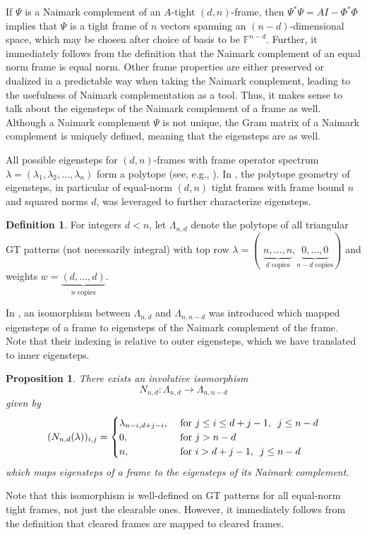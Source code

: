 \documentclass[10pt]{article}
\theoremstyle{plain}
\newtheorem{prop}[thm]{Proposition}
\theoremstyle{definition}
\newtheorem{definition}[thm]{Definition}
\newcommand{\bF}{\mathbb{F}}
\begin{document}
If $\Psi$ is a Naimark complement of an $A$-tight $(d,n)$-frame, then $\Psi^\ast \Psi = AI - \Phi^\ast \Phi$ implies that $\Psi$ is a tight frame of $n$ vectors spanning an $(n-d)$-dimensional space, which may be chosen after choice of basis to be $\bF^{n-d}$.  Further, it immediately follows from the definition that the Naimark complement of an equal norm frame is equal norm. Other frame properties are either preserved or dualized in a predictable way when taking the Naimark complement, leading to the usefulness of Naimark complementation as a tool. Thus, it makes sense to talk about the eigensteps of the Naimark complement of a frame as well.  Although a Naimark complement $\Psi$ is not unique, the Gram matrix of a Naimark complement is uniquely defined, meaning that the eigensteps are as well.

All possible eigensteps for $(d,n)$-frames with frame operator spectrum $\lambda = (\lambda_1, \lambda_2, \dots, \lambda_n)$ form a polytope (see, e.g., \cite{cahill2017connectivity}). In \cite{HPpolytope}, the polytope geometry of eigensteps, in particular of equal-norm $(d,n)$ tight frames with frame bound $n$ and squared norms $d$, was leveraged to further characterize eigensteps.
\begin{definition}
    For integers $d < n$, let $\Lambda_{n,d}$ denote the polytope of all triangular GT patterns (not necessarily integral) with top row $\lambda = (\,\,\underbrace{n, \dots, n}_{d \text{ copies}}, \underbrace{0, \dots, 0}_{n-d \text{ copies}})$ and weights $w=\underbrace{(d, \dots, d)}_{n \text{ copies}}$.
\end{definition}
In \cite{HPpolytope}, an isomorphism between $\Lambda_{n,d}$ and $\Lambda_{n,n-d}$ was introduced which mapped eigensteps of a frame to eigensteps of the Naimark complement of the frame. Note that their indexing is relative to outer eigensteps, which we have translated to inner eigensteps.

\begin{prop}\cite{HPpolytope}\label{prop:Naim_polytope}
There exists an involutive isomorphism
\[
N_{n,d}: \Lambda_{n,d} \longrightarrow \Lambda_{n, n-d}
\]
given by 
\[
(N_{n,d}(\lambda))_{i,j}= \begin{cases}
\lambda_{n-i, d+j-i}, & \text{ for } j \leq i \leq d+j-1, \enskip j \leq n-d  \\
0, & \text{ for } j > n-d \\
n, & \text{ for } i > d+j-1,\enskip j \leq n-d \\
\end{cases}
\]
which maps eigensteps of a frame to the eigensteps of its Naimark complement.
\end{prop}
Note that this isomorphism is well-defined on GT patterns for all equal-norm tight frames, not just the clearable ones.  However, it immediately follows from the definition that cleared frames are mapped to cleared frames.
\end{document}
